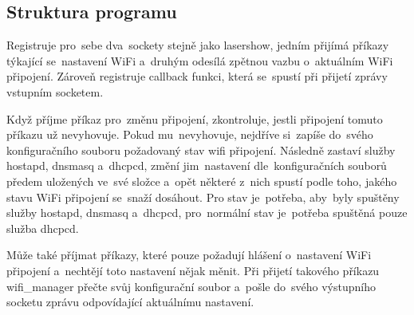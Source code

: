 \subsection{Struktura programu}

Registruje pro~sebe dva~sockety stejně jako lasershow, jedním přijímá příkazy týkající se~nastavení WiFi a~druhým odesílá zpětnou vazbu o~aktuálním WiFi připojení. Zároveň registruje callback funkci, která se~spustí při přijetí zprávy vstupním socketem.

Když příjme příkaz pro~změnu připojení, zkontroluje, jestli připojení tomuto příkazu už nevyhovuje. Pokud mu~nevyhovuje, nejdříve si~zapíše do~svého konfiguračního souboru požadovaný stav wifi připojení. Následně zastaví služby hostapd, dnsmasq a~dhcpcd, změní jim~nastavení dle~konfiguračních souborů předem uložených ve~své složce a~opět některé z~nich spustí podle toho, jakého stavu WiFi připojení se~snaží dosáhout.
Pro  stav je~potřeba, aby~byly spuštěny služby hostapd, dnsmasq a~dhcpcd, pro~normální  stav je~potřeba spuštěná pouze služba dhcpcd.

Může také příjmat příkazy, které pouze požadují hlášení o~nastavení WiFi připojení a~nechtějí toto nastavení nějak měnit. Při přijetí takového příkazu wifi\_manager přečte svůj konfigurační soubor a~pošle do~svého výstupního socketu zprávu odpovídající aktuálnímu nastavení.
